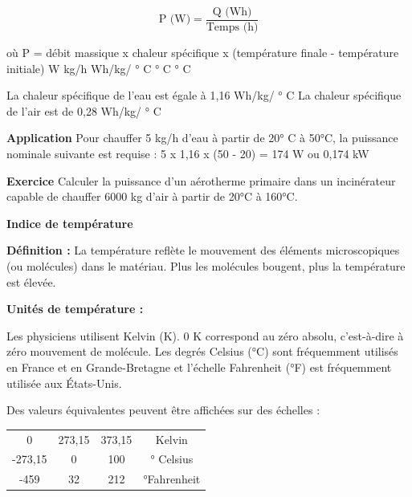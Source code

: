 \begin{equation}
    \text{P (W)} = \frac{\text{Q (Wh)}}{\text{Temps (h)}}
\end{equation}


où P = débit massique x chaleur spécifique x (température finale - température initiale)
  W	 kg/h	 	      Wh/kg/ ° C		      ° C			 ° C

La chaleur spécifique de l'eau est égale à 1,16 Wh/kg/ ° C
La chaleur spécifique de l'air est de 0,28 Wh/kg/ ° C


\textbf{Application}
\vspace{0.3cm}
Pour chauffer 5 kg/h d'eau à partir de 20° C à 50°C, la puissance nominale suivante est requise :
			5 x 1,16 x (50 - 20) = 174 W ou 0,174 kW

\vspace{0.3cm}
\textbf{Exercice}
\vspace{0.3cm}
Calculer la puissance d'un aérotherme primaire dans un incinérateur capable de chauffer 6000 kg d'air à partir de 20°C à 160°C.

\vspace{0.3cm}
\textbf{Indice de température}
\vspace{0.3cm}

\textbf{Définition :} La température reflète le mouvement des éléments microscopiques (ou molécules) dans le matériau. Plus les molécules bougent, plus la température est élevée.

\vspace{0.3cm}
\textbf{Unités de température :}
\vspace{0.3cm}

Les physiciens utilisent Kelvin (K). 0 K correspond au zéro absolu, c'est-à-dire à zéro mouvement de molécule.
Les degrés Celsius (°C) sont fréquemment utilisés en France et en Grande-Bretagne et l'échelle Fahrenheit (°F) est fréquemment utilisée aux États-Unis.

Des valeurs équivalentes peuvent être affichées sur des échelles :



\begin{table}
    \centering
    \begin{tabular}{|c|c|c|c|}
       0 & 273,15 & 373,15 & Kelvin \\
       -273,15  &  0 & 100 & ° Celsius \\
         -459 & 32	 & 212 & °Fahrenheit\\
    \end{tabular}
\end{table}
   			
